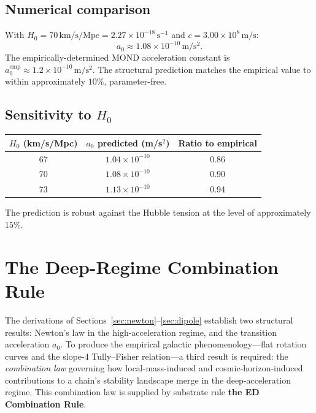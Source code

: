 \documentclass[11pt,a4paper]{article}
\begin{document}
\subsection{Numerical comparison}

With $H_0 = 70\,\mathrm{km/s/Mpc} = 2.27 \times 10^{-18}\,\mathrm{s^{-1}}$ and $c = 3.00 \times 10^8\,\mathrm{m/s}$:
\begin{equation}
a_0 \approx 1.08 \times 10^{-10}\,\mathrm{m/s^2}.
\end{equation}
The empirically-determined MOND acceleration constant is $a_0^{\mathrm{emp}} \approx 1.2 \times 10^{-10}\,\mathrm{m/s^2}$. The structural prediction matches the empirical value to within approximately $10\%$, parameter-free.

\subsection{Sensitivity to $H_0$}

\begin{table}[h]
\centering
\begin{tabular}{ccc}
\toprule
$H_0$ (km/s/Mpc) & $a_0$ predicted (m/s$^2$) & Ratio to empirical \\
\midrule
67 & $1.04 \times 10^{-10}$ & 0.86 \\
70 & $1.08 \times 10^{-10}$ & 0.90 \\
73 & $1.13 \times 10^{-10}$ & 0.94 \\
\bottomrule
\end{tabular}
\end{table}

The prediction is robust against the Hubble tension at the level of approximately $15\%$.

\section{The Deep-Regime Combination Rule}\label{sec:ed11}

The derivations of Sections~\ref{sec:newton}--\ref{sec:dipole} establish two structural results: Newton's law in the high-acceleration regime, and the transition acceleration $a_0$. To produce the empirical galactic phenomenology---flat rotation curves and the slope-4 Tully--Fisher relation---a third result is required: the \emph{combination law} governing how local-mass-induced and cosmic-horizon-induced contributions to a chain's stability landscape merge in the deep-acceleration regime. This combination law is supplied by substrate rule \textbf{the ED Combination Rule}.
\end{document}
